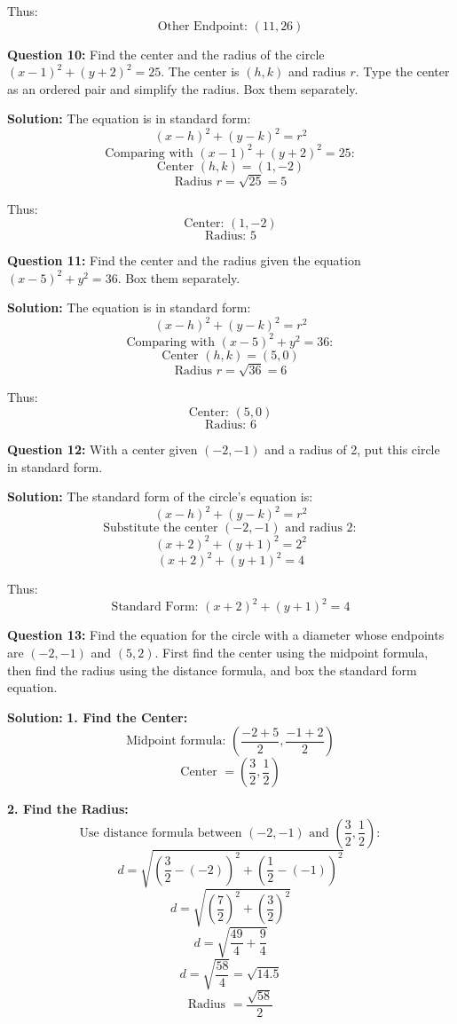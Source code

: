 \documentclass{article}
\begin{document}
Thus:
\[
\text{Other Endpoint: } \boxed{(11, 26)}
\]

\textbf{Question 10:} Find the center and the radius of the circle \((x-1)^2 + (y+2)^2 = 25\). The center is \((h, k)\) and radius \(r\). Type the center as an ordered pair and simplify the radius. Box them separately.

\textbf{Solution:}
The equation is in standard form:
\[
(x - h)^2 + (y - k)^2 = r^2
\]
\[
\text{Comparing with } (x-1)^2 + (y+2)^2 = 25:
\]
\[
\text{Center } (h, k) = (1, -2)
\]
\[
\text{Radius } r = \sqrt{25} = 5
\]

Thus:
\[
\text{Center: } \boxed{(1, -2)}
\]
\[
\text{Radius: } \boxed{5}
\]

\textbf{Question 11:} Find the center and the radius given the equation \((x-5)^2 + y^2 = 36\). Box them separately.

\textbf{Solution:}
The equation is in standard form:
\[
(x - h)^2 + (y - k)^2 = r^2
\]
\[
\text{Comparing with } (x-5)^2 + y^2 = 36:
\]
\[
\text{Center } (h, k) = (5, 0)
\]
\[
\text{Radius } r = \sqrt{36} = 6
\]

Thus:
\[
\text{Center: } \boxed{(5, 0)}
\]
\[
\text{Radius: } \boxed{6}
\]

\textbf{Question 12:} With a center given \((-2, -1)\) and a radius of 2, put this circle in standard form.

\textbf{Solution:}
The standard form of the circle's equation is:
\[
(x - h)^2 + (y - k)^2 = r^2
\]
\[
\text{Substitute the center } (-2, -1) \text{ and radius } 2:
\]
\[
(x + 2)^2 + (y + 1)^2 = 2^2
\]
\[
(x + 2)^2 + (y + 1)^2 = 4
\]

Thus:
\[
\text{Standard Form: } \boxed{(x + 2)^2 + (y + 1)^2 = 4}
\]

\textbf{Question 13:} Find the equation for the circle with a diameter whose endpoints are \((-2, -1)\) and \((5, 2)\). First find the center using the midpoint formula, then find the radius using the distance formula, and box the standard form equation.

\textbf{Solution:}
\textbf{1. Find the Center:}
\[
\text{Midpoint formula: } \left(\frac{-2 + 5}{2}, \frac{-1 + 2}{2}\right)
\]
\[
\text{Center } = \left(\frac{3}{2}, \frac{1}{2}\right)
\]

\textbf{2. Find the Radius:}
\[
\text{Use distance formula between } (-2, -1) \text{ and } \left(\frac{3}{2}, \frac{1}{2}\right):
\]
\[
d = \sqrt{\left(\frac{3}{2} - (-2)\right)^2 + \left(\frac{1}{2} - (-1)\right)^2}
\]
\[
d = \sqrt{\left(\frac{7}{2}\right)^2 + \left(\frac{3}{2}\right)^2}
\]
\[
d = \sqrt{\frac{49}{4} + \frac{9}{4}}
\]
\[
d = \sqrt{\frac{58}{4}} = \sqrt{14.5}
\]
\[
\text{Radius } = \frac{\sqrt{58}}{2}
\]
\end{document}
